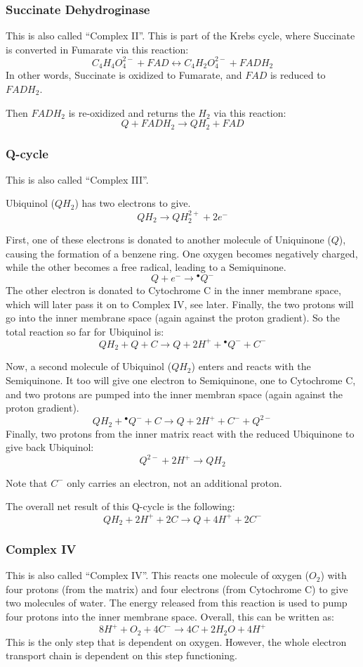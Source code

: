 \documentclass{article}
\begin{document}
\subsubsection{Succinate Dehydroginase}
This is also called ``Complex II''. This is part of the Krebs cycle, where
Succinate is converted in Fumarate via this reaction:
\[
    C_4H_4O_4^{2-} + FAD \leftrightarrow C_4H_2O_4^{2-} + FADH_2
\]
In other words, Succinate is oxidized to Fumarate, and $FAD$ is reduced to $FADH_2$.

Then $FADH_2$ is re-oxidized and returns the $H_2$ via this reaction:
\[
    Q + FADH_2 \rightarrow QH_2 + FAD
\]

\subsubsection{Q-cycle}
This is also called ``Complex III''.

Ubiquinol ($QH_2$) has two electrons to give.
\[
    QH_2 \rightarrow QH_2^{2+} + 2e^-
\]

First, one of these electrons is donated to another molecule of Uniquinone ($Q$), causing the
formation of a benzene ring.  One oxygen becomes negatively charged, while the other
becomes a free radical, leading to a Semiquinone.
\[
    Q + e^- \rightarrow {}^{\bullet}Q^{-}
\]
The other electron is donated to Cytochrome C in the inner membrane space, which will later
pass it on to Complex IV, see later. Finally, the two protons will go into the inner
membrane space (again against the proton gradient). So the total reaction so far for
Ubiquinol is:
\[
    QH_2 + Q + C \rightarrow Q + 2H^+ + {}^{\bullet}Q^{-} + C^-
\]

Now, a second molecule of Ubiquinol ($QH_2$) enters and reacts with the Semiquinone.
It too will give one electron to Semiquinone, one to Cytochrome C, and two protons
are pumped into the inner membran space (again against the proton gradient).
\[
    QH_2 + {}^{\bullet}Q^{-} + C \rightarrow Q + 2H^+ + C^- + Q^{2-}
\]
Finally, two protons from the inner matrix react with the reduced Ubiquinone to give back
Ubiquinol:
\[
    Q^{2-} + 2H^+ \rightarrow QH_2
\]

Note that $C^-$ only carries an electron, not an additional proton.

The overall net result of this Q-cycle is the following:
\[
    QH_2 + 2H^+ + 2C \rightarrow Q + 4H^+ + 2C^-
\]

\subsubsection{Complex IV}
This is also called ``Complex IV''.
This reacts one molecule of oxygen ($O_2$) with four protons (from the matrix) and four
electrons (from Cytochrome C) to give two molecules of water. The energy released
from this reaction is used to pump four protons into the inner membrane space.
Overall, this can be written as:
\[
    8H^+ + O_2 + 4C^- \rightarrow 4C + 2H_2O + 4H^+
\]
This is the only step that is dependent on oxygen. However, the whole electron transport
chain is dependent on this step functioning.
\end{document}
